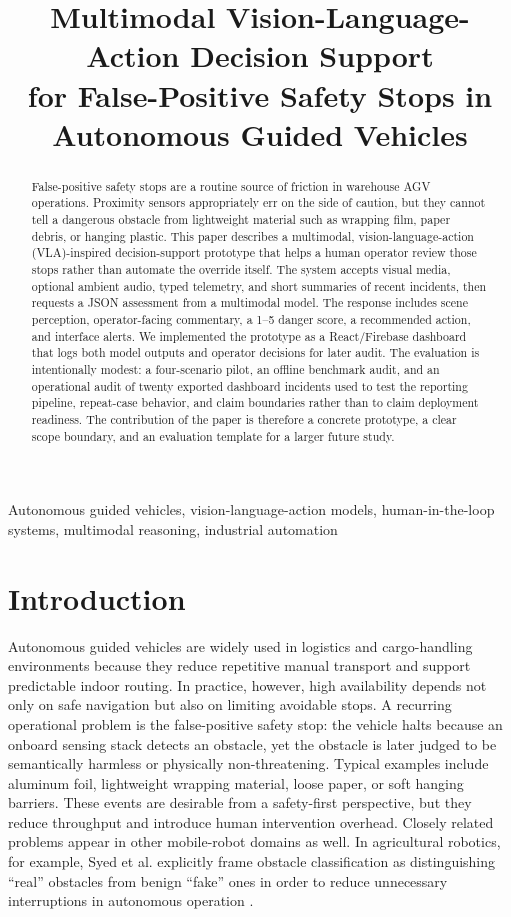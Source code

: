 \documentclass[conference]{IEEEtran}
\title{Multimodal Vision-Language-Action Decision Support\\for False-Positive Safety Stops in Autonomous Guided Vehicles}
\author{
\IEEEauthorblockN{Vikas Rathore, Neha Anil Khot}
\IEEEauthorblockA{
Information Technology\\
Frankfurt University of Applied Sciences\\
Autonomous Intelligent Systems\\
vikas.rathore@stud.fra-uas.de\\
neha.khot@stud.fra-uas.de
}
}
\begin{document}
\maketitle

\begin{abstract}
False-positive safety stops are a routine source of friction in warehouse AGV operations. Proximity sensors appropriately err on the side of caution, but they cannot tell a dangerous obstacle from lightweight material such as wrapping film, paper debris, or hanging plastic. This paper describes a multimodal, vision-language-action (VLA)-inspired decision-support prototype that helps a human operator review those stops rather than automate the override itself. The system accepts visual media, optional ambient audio, typed telemetry, and short summaries of recent incidents, then requests a JSON assessment from a multimodal model. The response includes scene perception, operator-facing commentary, a 1--5 danger score, a recommended action, and interface alerts. We implemented the prototype as a React/Firebase dashboard that logs both model outputs and operator decisions for later audit. The evaluation is intentionally modest: a four-scenario pilot, an offline benchmark audit, and an operational audit of twenty exported dashboard incidents used to test the reporting pipeline, repeat-case behavior, and claim boundaries rather than to claim deployment readiness. The contribution of the paper is therefore a concrete prototype, a clear scope boundary, and an evaluation template for a larger future study.
\end{abstract}

\begin{IEEEkeywords}
Autonomous guided vehicles, vision-language-action models, human-in-the-loop systems, multimodal reasoning, industrial automation
\end{IEEEkeywords}

\section{Introduction}
Autonomous guided vehicles are widely used in logistics and cargo-handling environments because they reduce repetitive manual transport and support predictable indoor routing. In practice, however, high availability depends not only on safe navigation but also on limiting avoidable stops. A recurring operational problem is the false-positive safety stop: the vehicle halts because an onboard sensing stack detects an obstacle, yet the obstacle is later judged to be semantically harmless or physically non-threatening. Typical examples include aluminum foil, lightweight wrapping material, loose paper, or soft hanging barriers. These events are desirable from a safety-first perspective, but they reduce throughput and introduce human intervention overhead. Closely related problems appear in other mobile-robot domains as well. In agricultural robotics, for example, Syed et al. explicitly frame obstacle classification as distinguishing ``real'' obstacles from benign ``fake'' ones in order to reduce unnecessary interruptions in autonomous operation \cite{syed2025orchard}.
\end{document}
